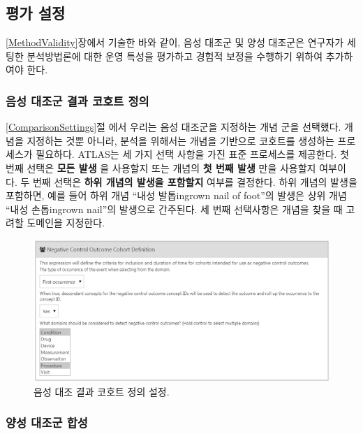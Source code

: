 \documentclass[10.5pt]{book}
\theoremstyle{definition}
\theoremstyle{definition}
\theoremstyle{definition}
\theoremstyle{remark}
\begin{document}
\subsection{평가 설정}\label{evaluationSettings}

\ref{MethodValidity}장에서 기술한 바와 같이, 음성 대조군 및 양성
대조군은 연구자가 세팅한 분석방법론에 대한 운영 특성을 평가하고 경험적
보정을 수행하기 위하여 추가하여야 한다.

\subsubsection*{음성 대조군 결과 코호트 정의}\label{----}

\ref{ComparisonSettings}절 에서 우리는 음성 대조군을 지정하는 개념 군을
선택했다. 개념을 지정하는 것뿐 아니라, 분석을 위해서는 개념을 기반으로
코호트를 생성하는 프로세스가 필요하다. ATLAS는 세 가지 선택 사항을 가진
표준 프로세스를 제공한다. 첫 번째 선택은 \textbf{모든 발생} 을 사용할지
또는 개념의 \textbf{첫 번째 발생} 만을 사용할지 여부이다. 두 번째 선택은
\textbf{하위 개념의 발생을 포함할지} 여부를 결정한다. 하위 개념의 발생을
포함하면, 예를 들어 하위 개념 ``내성 발톱ingrown nail of foot''의 발생은
상위 개념 ``내성 손톱ingrown nail''의 발생으로 간주된다. 세 번째
선택사항은 개념을 찾을 때 고려할 도메인을 지정한다.

\begin{figure}

{\centering \includegraphics[width=1\linewidth]{images/PopulationLevelEstimation/ncSettings} 

}

\caption{음성 대조 결과 코호트 정의 설정.}\label{fig:ncSettings}
\end{figure}

\subsubsection*{양성 대조군 합성}\label{--}
\end{document}
